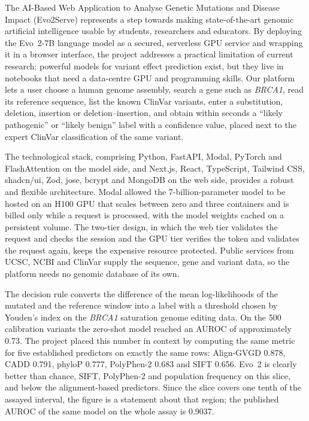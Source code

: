 \vspace{-8pt}
The AI-Based Web Application to Analyse Genetic Mutations and Disease Impact (Evo2Serve) represents a step towards making state-of-the-art genomic artificial intelligence usable by students, researchers and educators. By deploying the Evo~2-7B language model as a secured, serverless GPU service and wrapping it in a browser interface, the project addresses a practical limitation of current research: powerful models for variant effect prediction exist, but they live in notebooks that need a data-centre GPU and programming skills. Our platform lets a user choose a human genome assembly, search a gene such as \textit{BRCA1}, read its reference sequence, list the known ClinVar variants, enter a substitution, deletion, insertion or deletion--insertion, and obtain within seconds a ``likely pathogenic'' or ``likely benign'' label with a confidence value, placed next to the expert ClinVar classification of the same variant.

The technological stack, comprising Python, FastAPI, Modal, PyTorch and FlashAttention on the model side, and Next.js, React, TypeScript, Tailwind CSS, shadcn/ui, Zod, jose, bcrypt and MongoDB on the web side, provides a robust and flexible architecture. Modal allowed the 7-billion-parameter model to be hosted on an H100 GPU that scales between zero and three containers and is billed only while a request is processed, with the model weights cached on a persistent volume. The two-tier design, in which the web tier validates the request and checks the session and the GPU tier verifies the token and validates the request again, keeps the expensive resource protected. Public services from UCSC, NCBI and ClinVar supply the sequence, gene and variant data, so the platform needs no genomic database of its own.

The decision rule converts the difference of the mean log-likelihoods of the mutated and the reference window into a label with a threshold chosen by Youden's index on the \textit{BRCA1} saturation genome editing data. On the 500 calibration variants the zero-shot model reached an AUROC of approximately 0.73. The project placed this number in context by computing the same metric for five established predictors on exactly the same rows: Align-GVGD 0.878, CADD 0.791, phyloP 0.777, PolyPhen-2 0.683 and SIFT 0.656. Evo~2 is clearly better than chance, SIFT, PolyPhen-2 and population frequency on this slice, and below the alignment-based predictors. Since the slice covers one tenth of the assayed interval, the figure is a statement about that region; the published AUROC of the same model on the whole assay is 0.9037.

